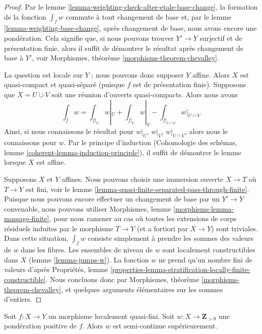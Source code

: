 \begin{proof}
Par le lemme \ref{lemma-weighting-check-after-etale-base-change},
la formation de la fonction $\int_f w$ commute à tout
changement de base et, par le lemme \ref{lemma-weighting-base-change},
après changement de base, nous avons encore une pondération.
Cela signifie que, si nous pouvons trouver $Y' \to Y$
surjectif et de présentation finie, alors il
suffit de démontrer le résultat après changement de base à $Y'$, voir
Morphismes, théorème \ref{morphisms-theorem-chevalley}.

\medskip\noindent
La question est locale sur $Y$ ; nous pouvons donc supposer $Y$ affine.
Alors $X$ est quasi-compact et quasi-séparé
(puisque $f$ est de présentation finie). Supposons que $X = U \cup V$
soit une réunion d'ouverts quasi-compacts. Alors nous avons
$$
\textstyle{\int}_f w =
\textstyle{\int}_{f|_U} w|_U +
\textstyle{\int}_{f|_V} w|_V -
\textstyle{\int}_{f|_{U \cap V}} w|_{U \cap V}
$$
Ainsi, si nous connaissons le résultat pour $w|_U$, $w|_V$, $w|_{U \cap V}$,
alors nous le connaissons pour $w$. Par le principe d'induction
(Cohomologie des schémas, lemme \ref{coherent-lemma-induction-principle}),
il suffit de démontrer le lemme lorsque $X$ est affine.

\medskip\noindent
Supposons $X$ et $Y$ affines. Nous pouvons choisir une immersion ouverte
$X \to T$ où $T \to Y$ est fini, voir le
lemme \ref{lemma-quasi-finite-separated-pass-through-finite}.
Puisque nous pouvons encore effectuer un changement de base par un $Y' \to Y$ convenable,
nous pouvons utiliser Morphismes, lemme \ref{morphisms-lemma-massage-finite},
pour nous ramener au cas où
toutes les extensions de corps résiduels induites par le morphisme $T \to Y$
(et a fortiori par $X \to Y$) sont triviales.
Dans cette situation, $\int_f w$ consiste simplement à prendre les sommes
des valeurs de $w$ dans les fibres. Les ensembles de niveau de $w$
sont localement constructibles dans $X$ (lemme \ref{lemma-jumps-w}).
La fonction $w$ ne prend qu'un nombre fini de valeurs d'après
Propriétés, lemme
\ref{properties-lemma-stratification-locally-finite-constructible}.
Nous concluons donc par
Morphismes, théorème \ref{morphisms-theorem-chevalley},
et quelques arguments élémentaires sur les sommes d'entiers.
\end{proof}

\begin{lemma}
\label{lemma-semicontinuous-w}
Soit $f : X \to Y$ un morphisme localement quasi-fini.
Soit $w : X \to \mathbf{Z}_{> 0}$ une pondération positive de $f$.
Alors $w$ est semi-continue supérieurement.
\end{lemma}

